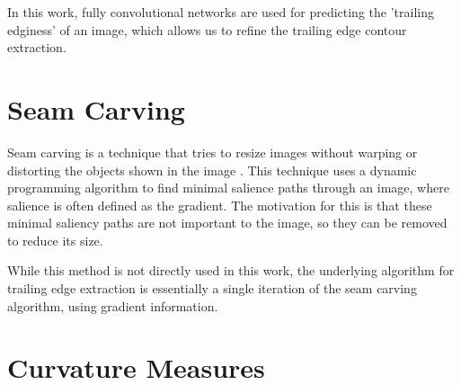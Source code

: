 In this work, fully convolutional networks are used for predicting the 'trailing edginess' of an image, which allows us to refine the trailing edge contour extraction. 



\section{Seam Carving}

Seam carving is a technique that tries to resize images without warping or distorting the objects shown in the image \cite{Avidan:2007:SCC:1276377.1276390}.
This technique uses a dynamic programming algorithm to find minimal salience paths through an image, where salience is often defined as the gradient.
The motivation for this is that these minimal saliency paths are not important to the image, so they can be removed to reduce its size.

While this method is not directly used in this work, the underlying algorithm for trailing edge extraction is essentially a single iteration of the seam carving algorithm, using gradient information.

\section{Curvature Measures}

